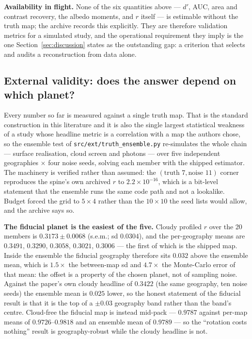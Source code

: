 \documentclass[twocolumn,10pt]{article}
\begin{document}
\textbf{Availability in flight.} None of the six quantities above --- $d'$, AUC,
area and contrast recovery, the albedo moments, and $r$ itself --- is estimable
without the truth map; the archive records this explicitly. They are therefore
validation metrics for a simulated study, and the operational requirement they
imply is the one Section~\ref{sec:discussion} states as the outstanding gap: a
criterion that selects and audits a reconstruction from data alone.

\subsection{External validity: does the answer depend on which planet?}
\label{sec:truthens}
Every number so far is measured against a single truth map. That is the
standard construction in this literature and it is also the single largest
statistical weakness of a study whose headline metric is a correlation with a
map the authors chose, so the ensemble test of {\tt src/ext/truth\_ensemble.py}
re-simulates the whole chain --- surface realisation, cloud screen and photons
--- over five independent geographies $\times$ four noise seeds, solving each
member with the shipped estimator. The machinery is verified rather than
assumed: the $(\text{truth }7, \text{noise }11)$ corner reproduces the spine's
own archived $r$ to $2.2\times10^{-16}$, which is a bit-level statement that the
ensemble runs the same code path and not a lookalike. Budget forced the grid to
$5\times4$ rather than the $10\times10$ the seed lists would allow, and the
archive says so.

\textbf{The fiducial planet is the easiest of the five.} Cloudy profiled $r$
over the 20 members is $0.3173\pm0.0068$ (s.e.m.; sd $0.0304$), and the
per-geography means are $0.3491$, $0.3290$, $0.3058$, $0.3021$, $0.3006$ --- the
first of which is the shipped map. Inside the ensemble the fiducial geography
therefore sits $0.032$ above the ensemble mean, which is $1.5\times$ the
between-map sd and $4.7\times$ the Monte-Carlo error of that mean: the offset is
a property of the chosen planet, not of sampling noise. Against the paper's own
cloudy headline of $0.3422$ (the same geography, ten noise seeds) the ensemble
mean is $0.025$ lower, so the honest statement of the fiducial result is that it
is the top of a $\pm0.03$ geography band rather than the band's centre.
Cloud-free the fiducial map is instead mid-pack --- $0.9787$ against per-map
means of $0.9726$--$0.9818$ and an ensemble mean of $0.9789$ --- so the
``rotation costs nothing'' result is geography-robust while the cloudy headline
is not.
\end{document}
